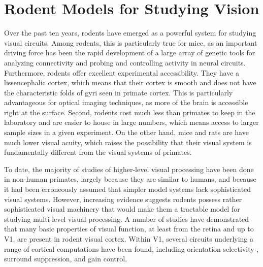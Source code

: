 \section{Rodent Models for Studying Vision}
Over the past ten years, rodents have emerged as a powerful system for studying visual circuits. Among rodents, this is particularly true for mice, as an important driving force has been the rapid development of a large array of genetic tools for analyzing connectivity and probing and controlling activity in neural circuits\cite{Luo2008, Luo2018}. Furthermore, rodents offer excellent experimental accessibility. They have a lissencephalic cortex, which means that their cortex is smooth and does not have the characteristic folds of gyri seen in primate cortex. This is particularly advantageous for optical imaging techniques, as more of the brain is accessible right at the surface. Second, rodents cost much less than primates to keep in the laboratory and are easier to house in large numbers, which means access to larger sample sizes in a given experiment. On the other hand, mice and rats are have much lower visual acuity, which raises the possibility that their visual system is fundamentally different from the visual systems of primates. 

To date, the majority of studies of higher-level visual processing have been done in non-human primates, largely because they are similar to humans, and because it had been erroneously assumed that simpler model systems lack sophisticated visual systems. However, increasing evidence suggests rodents possess rather sophisticated visual machinery that would make them a tractable model for studying multi-level visual processing. A number of studies have demonstrated that many basic properties of visual function, at least from the retina and up to V1, are present in rodent visual cortex\cite{Huberman2011}. Within V1, several circuits underlying a range of cortical computations have been found, including orientation selectivity \cite{Ko2011, Lien2013}, surround suppression\cite{Adesnik2012}, and gain control\cite{Atallah2012}. 

